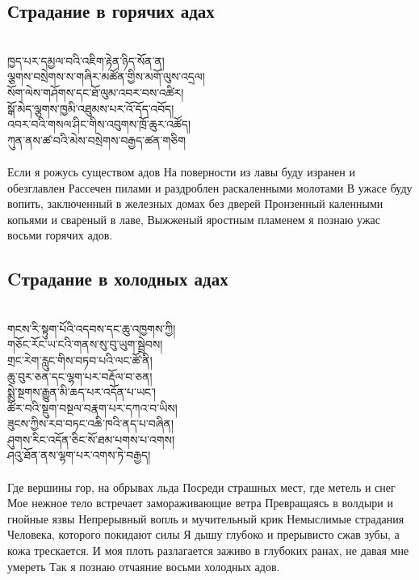 \subsection*{Страдание в горячих адах}
\\
\ti
ཁྱད་པར་དམྱལ་བའི་འཇིག་རྟེན་ཉིད་སོན་ན།\\
ལྕགས་བསྲེགས་ས་གཞིར་མཚོན་གྱིས་མགོ་ལུས་འདྲལ།\\
སོག་ལེས་གཤོགས་དང་ཐོ་ལུམ་འབར་བས་འཚིར།\\
སྒོ་མེད་ལྕགས་ཁྱམི་འཐུམས་པར་འོ་དོད་འབོད།\\
འབར་བའི་གསལ་ཤིང་གིས་འབུགས་ཁྲོ་ཆུར་འཚོད།\\
ཀུན་ནས་ཚ་བའི་མེས་བསྲེགས་བརྒྱད་ཚན་གཅིག\\
\\
\ru
Если я рожусь существом адов
На поверности из лавы буду изранен и обезглавлен
Рассечен пилами и раздроблен раскаленными молотами
В ужасе буду вопить, заключенный в железных домах без дверей Пронзенный каленными копьями и свареный в лаве,
Выжженый яростным пламенем я познаю ужас восьми горячих адов.

\newpage
\subsection*{Cтрадание в холодных адах}
\\
\ti
གངས་རི་སྟུག་པོའི་འདབས་དང་ཆུ་འཁྱགས་ཀྱི། \\
གཅོང་རོང་ཡ་ངའི་གནས་སུ་བུ་ཡུག་སྦྲེབས། \\
གྲང་རེག་རླུང་གིས་བཏབ་པའི་ལང་ཚོ་ནི། \\
ཆུ་བུར་ཅན་དང་ལྷག་པར་བརྡོལ་བ་ཅན། \\
སྨྲེ་སྔགས་རྒྱུན་མི་ཆད་པར་འདོན་པ་ཡང་། \\
ཚོར་བའི་སྡུག་བསྔལ་བརྣག་པར་དཀའ་བ་ཡིས།\\
ཟུངས་ཀྱིས་རབ་བཏང་འཆི་ཁའི་ནད་པ་བཞིན།\\
ཤུགས་རིང་འདོན་ཅིང་སོ་ཐམ་པགས་པ་འགས། \\
ཤའུ་ཐོན་ནས་ལྷག་པར་འགས་ཏེ་བརྒྱད།\\
\\
\ru
Где вершины гор, на обрывах льда
Посреди страшных мест, где метель и снег
Мое нежное тело встречает замораживающие ветра
Превращаясь в волдыри и гнойные язвы
Непрерывный вопль и мучительный крик
Немыслимые страдания
Человека, которого покидают силы
Я дышу глубоко и прерывисто сжав зубы, а кожа трескается.
И моя плоть разлагается заживо в глубоких ранах,
не давая мне умереть Так я познаю отчаяние восьми холодных адов.

\newpage
